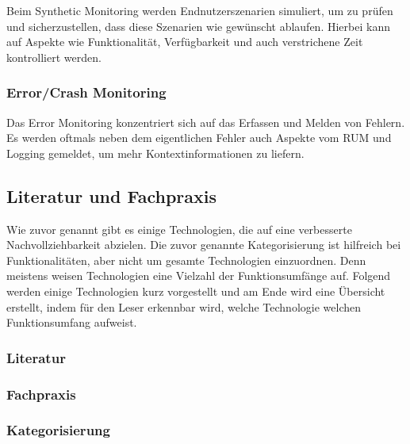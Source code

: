 Beim Synthetic Monitoring werden Endnutzerszenarien simuliert, um zu prüfen und sicherzustellen, dass diese Szenarien wie gewünscht ablaufen. Hierbei kann auf Aspekte wie Funktionalität, Verfügbarkeit und auch verstrichene Zeit kontrolliert werden.

\subsubsection{Error/Crash Monitoring}

Das Error Monitoring konzentriert sich auf das Erfassen und Melden von Fehlern. Es werden oftmals neben dem eigentlichen Fehler auch Aspekte vom RUM und Logging gemeldet, um mehr Kontextinformationen zu liefern.

\subsection{Literatur und Fachpraxis}

Wie zuvor genannt gibt es einige Technologien, die auf eine verbesserte Nachvollziehbarkeit abzielen. Die zuvor genannte Kategorisierung ist hilfreich bei Funktionalitäten, aber nicht um gesamte Technologien einzuordnen. Denn meistens weisen Technologien eine Vielzahl der Funktionsumfänge auf. Folgend werden einige Technologien kurz vorgestellt und am Ende wird eine Übersicht erstellt, indem für den Leser erkennbar wird, welche Technologie welchen Funktionsumfang aufweist.

\subsubsection{Literatur}

\subsubsection{Fachpraxis}








\subsubsection{Kategorisierung}

